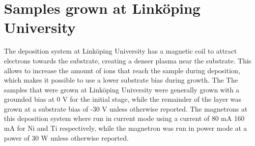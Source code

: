 \section{Samples grown at Linköping University}
The deposition system at Linköping University has a magnetic coil to attract electrons towards the substrate, creating a denser plasma near the substrate. This allows to increase the amount of ions that reach the sample during deposition, which makes it possible to use a lower substrate bias during growth. The The samples that were grown at Linköping University were generally grown with a grounded bias at 0 V for the initial stage, while the remainder of the layer was grown at a substrate bias of -30 V unless otherwise reported. The magnetrons at this deposition system where run in current mode using a current of 80 mA 160 mA for Ni and Ti respectively, while the \BC magnetron was run in power mode at a power of 30 W unless otherwise reported.
\\
